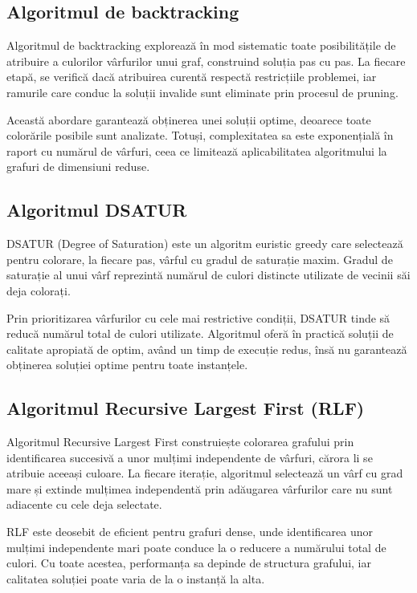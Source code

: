 \documentclass[runningheads]{llncs}
\begin{document}
\subsection{Algoritmul de backtracking}

Algoritmul de backtracking explorează în mod sistematic toate posibilitățile
de atribuire a culorilor vârfurilor unui graf, construind soluția pas cu pas.
La fiecare etapă, se verifică dacă atribuirea curentă respectă restricțiile
problemei, iar ramurile care conduc la soluții invalide sunt eliminate prin
procesul de pruning.

Această abordare garantează obținerea unei soluții optime, deoarece toate
colorările posibile sunt analizate. Totuși, complexitatea sa este exponențială
în raport cu numărul de vârfuri, ceea ce limitează aplicabilitatea algoritmului
la grafuri de dimensiuni reduse.

\subsection{Algoritmul DSATUR}

DSATUR (Degree of Saturation) este un algoritm euristic greedy care selectează
pentru colorare, la fiecare pas, vârful cu gradul de saturație maxim. Gradul
de saturație al unui vârf reprezintă numărul de culori distincte utilizate de
vecinii săi deja colorați.

Prin prioritizarea vârfurilor cu cele mai restrictive condiții, DSATUR tinde
să reducă numărul total de culori utilizate. Algoritmul oferă în practică
soluții de calitate apropiată de optim, având un timp de execuție redus, însă
nu garantează obținerea soluției optime pentru toate instanțele.

\subsection{Algoritmul Recursive Largest First (RLF)}

Algoritmul Recursive Largest First construiește colorarea grafului prin
identificarea succesivă a unor mulțimi independente de vârfuri, cărora li se
atribuie aceeași culoare. La fiecare iterație, algoritmul selectează un vârf
cu grad mare și extinde mulțimea independentă prin adăugarea vârfurilor care
nu sunt adiacente cu cele deja selectate.

RLF este deosebit de eficient pentru grafuri dense, unde identificarea unor
mulțimi independente mari poate conduce la o reducere a numărului total de
culori. Cu toate acestea, performanța sa depinde de structura grafului, iar
calitatea soluției poate varia de la o instanță la alta.
\end{document}
